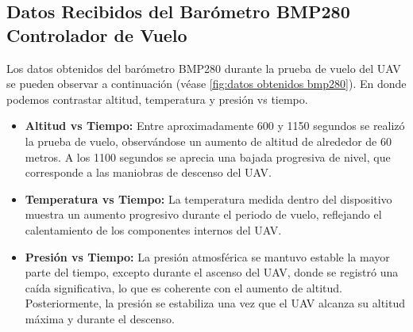     \subsection{Datos Recibidos del Barómetro BMP280 Controlador de Vuelo}
        Los datos obtenidos del barómetro BMP280 durante la prueba de vuelo del UAV se pueden observar a continuación (véase \ref{fig:datos obtenidos bmp280}). En donde podemos contrastar altitud, temperatura y presión vs tiempo.\\
        \begin{itemize}
            \item \textbf{Altitud vs Tiempo:} Entre aproximadamente 600 y 1150 segundos se realizó la prueba de vuelo, observándose un aumento de altitud de alrededor de 60 metros. A los 1100 segundos se aprecia una bajada progresiva de nivel, que corresponde a las maniobras de descenso del UAV.\\
            \item \textbf{Temperatura vs Tiempo:} La temperatura medida dentro del dispositivo muestra un aumento progresivo durante el periodo de vuelo, reflejando el calentamiento de los componentes internos del UAV.\\
            \item \textbf{Presión vs Tiempo:} La presión atmosférica se mantuvo estable la mayor parte del tiempo, excepto durante el ascenso del UAV, donde se registró una caída significativa, lo que es coherente con el aumento de altitud. Posteriormente, la presión se estabiliza una vez que el UAV alcanza su altitud máxima y durante el descenso.
            
        \end{itemize}




